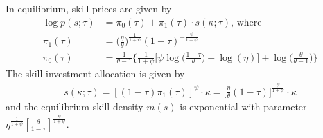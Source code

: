 \documentclass{article}
\begin{document}
{
\proposition In equilibrium, skill prices are given by
\begin{align}
\log p(s; \tau) &= \pi_0(\tau) + \pi_1(\tau) \cdot s(\kappa; \tau) \text{, where} \label{prop2_s}\\
\pi_1(\tau) &= \Bigg( \frac{\eta}{\theta} \Bigg)^{\frac{1}{1+\psi}}(1-\tau)^{-\frac{\psi}{1+\psi}} \label{prop2_pi1}\\
\pi_0(\tau) &= \frac{1}{\theta-1} \Bigg\{ \frac{1}{1+\psi} \Bigg[\psi \log \Bigg( \frac{1-\tau}{\theta}\Bigg) - \log (\eta)\Bigg] + \log\Bigg(\frac{\theta}{\theta - 1}\Bigg) \Bigg\} \label{prop2_pi0}
\end{align} 
The skill investment allocation is given by
\begin{align}
s(\kappa;\tau) = [(1-\tau)\pi_1(\tau)]^{\psi} \cdot \kappa = \Bigg[ \frac{\eta}{\theta}(1-\tau) \Bigg]^{\frac{\psi}{1+\psi}}\cdot \kappa 
\label{prop2_s}
\end{align} 
and the equilibrium skill density $m(s)$ is exponential with parameter $\eta^{\frac{1}{1+\psi}} [\frac{\theta}{1-\tau}]^{\frac{\psi}{1+\psi}}$.
}

\pagebreak
\end{document}
